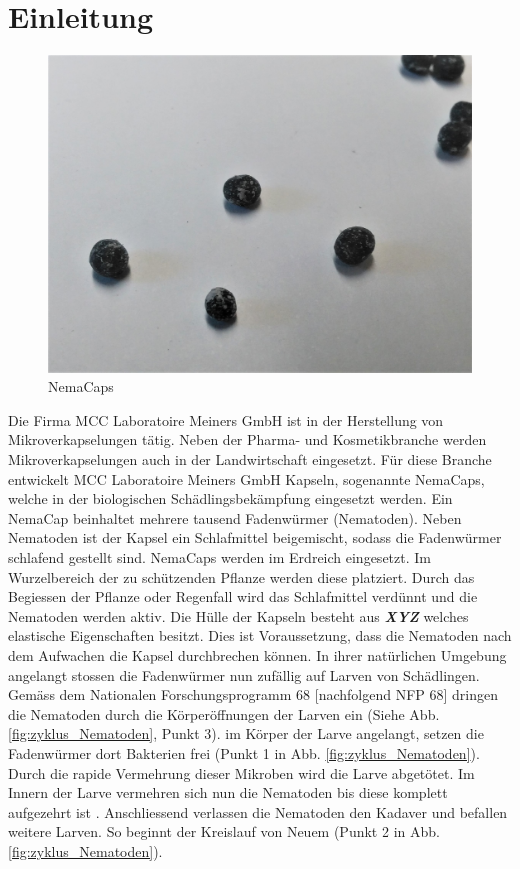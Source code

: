 \newpage
\section{Einleitung}
\begin{figure}
	\includegraphics[scale=0.11]{Illustrationen/3-Einleitung/nemacaps.jpg}
	\caption{NemaCaps}
	\label{fig:nemacaps}
\end{figure}
Die Firma MCC Laboratoire Meiners GmbH ist in der Herstellung von Mikroverkapselungen tätig. Neben der Pharma- und Kosmetikbranche werden Mikroverkapselungen auch in der Landwirtschaft eingesetzt. Für diese Branche entwickelt MCC Laboratoire Meiners GmbH Kapseln, sogenannte NemaCaps, welche in der biologischen Schädlingsbekämpfung eingesetzt werden. Ein NemaCap beinhaltet mehrere tausend Fadenwürmer (Nematoden). Neben Nematoden ist der Kapsel ein Schlafmittel beigemischt, sodass die Fadenwürmer schlafend gestellt sind. 
\newline
NemaCaps werden im Erdreich eingesetzt. Im Wurzelbereich der zu schützenden Pflanze werden diese platziert. Durch das Begiessen der Pflanze oder Regenfall wird das Schlafmittel verdünnt und die Nematoden werden aktiv. Die Hülle der Kapseln besteht aus \textbf{\textit{XYZ}} welches elastische Eigenschaften besitzt. Dies ist Voraussetzung, dass die Nematoden nach dem Aufwachen die Kapsel durchbrechen können.\newline
In ihrer natürlichen Umgebung angelangt stossen die Fadenwürmer nun zufällig auf Larven von Schädlingen. Gemäss dem Nationalen Forschungsprogramm 68 [nachfolgend NFP 68]\cite{nfp} dringen die Nematoden durch die Körperöffnungen der Larven ein (Siehe Abb.  \ref{fig:zyklus_Nematoden}, Punkt 3). im Körper der Larve angelangt, setzen die Fadenwürmer dort Bakterien frei (Punkt 1 in Abb.  \ref{fig:zyklus_Nematoden}). Durch die rapide Vermehrung dieser Mikroben wird die Larve abgetötet. Im Innern der Larve vermehren sich nun die Nematoden bis diese komplett aufgezehrt ist \cite{nematoden}. Anschliessend verlassen die Nematoden den Kadaver und befallen weitere Larven. So beginnt der Kreislauf von Neuem (Punkt 2 in Abb.  \ref{fig:zyklus_Nematoden}).
\newline

